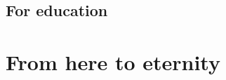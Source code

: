 \documentclass[fleqn,10pt]{SelfArx} %
\begin{document}
\subsection{For education}

\section{From here to eternity}


\printbibliography

\end{document}
